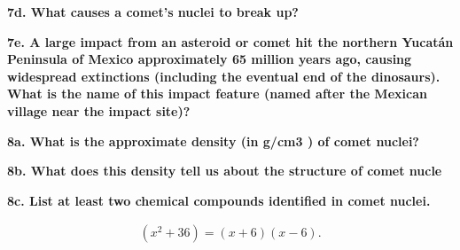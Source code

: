 \documentclass{report}
\begin{document}
    \bigbreak \noindent 
    \textbf{7d. What causes a comet’s nuclei to break up?}
    \bigbreak \noindent 
    
    \bigbreak \noindent 
    \textbf{7e. A large impact from an asteroid or comet hit the northern Yucatán Peninsula of Mexico
approximately 65 million years ago, causing widespread extinctions (including the eventual end
of the dinosaurs). What is the name of this impact feature (named after the Mexican village
near the impact site)?}
    \bigbreak \noindent 

    \bigbreak \noindent 
    \textbf{8a. What is the approximate density (in g/cm3
) of comet nuclei?}
    \bigbreak \noindent 

    \pagebreak \bigbreak \noindent 
    \textbf{8b.  What does this density tell us about the structure of comet nucle}
    \bigbreak \noindent 
    
    \bigbreak \noindent 
    \textbf{8c. List at least two chemical compounds identified in comet nuclei. }
    \bigbreak \noindent 

    \begin{align*}
        (x^{2}+36) = (x+6)(x-6)
    .\end{align*}
\end{document}
